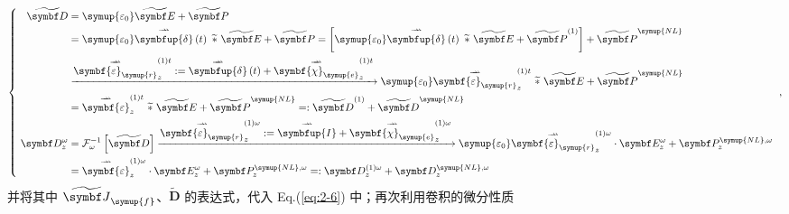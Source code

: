 \begin{equation} \label{eq:2-11}
	\left\{\ \begin{aligned} \widetilde{\symbf D} &= {\symup{\varepsilon_0}} \widetilde{\symbf E} + \widetilde{\symbf P} \\ &= {\symup{\varepsilon_0}} \overset{\rightharpoonup\!\!\!\! \rightharpoonup}{\symbfup{\delta}} \left( t \right)\ \widetilde *\ \widetilde{\symbf E} + \widetilde{\symbf P} = \left[{\symup{\varepsilon_0}} \overset{\rightharpoonup\!\!\!\! \rightharpoonup}{\symbfup{\delta}} \left( t \right)\ \widetilde *\ \widetilde{\symbf E} + \widetilde{\symbf P}^{(1)} \right] + \widetilde{\symbf P}^{{\symup{NL}}} \\& \xrightarrow[]{\displaystyle{ \overset{\rightharpoonup\!\!\!\! \rightharpoonup}{\symbf{\varepsilon}_{\symup{r}}}^{(1)t}_{z} := \overset{\rightharpoonup\!\!\!\! \rightharpoonup}{\symbfup{\delta}} \left( t \right) + \overset{\rightharpoonup\!\!\!\! \rightharpoonup}{\symbf{\chi}_{\symup{e}}}^{(1)t}_{z}}} {\symup{\varepsilon_0}} \overset{\rightharpoonup\!\!\!\! \rightharpoonup}{\symbf{\varepsilon}_{\symup{r}}}^{(1)t}_{z}\ \widetilde *\ \widetilde{\symbf E} + \widetilde{\symbf P}^{{\symup{NL}}} \\ &= \overset{\rightharpoonup\!\!\!\! \rightharpoonup}{\symbf{\varepsilon}}^{(1)t}_{z}\ \widetilde *\ \widetilde{\symbf E} + \widetilde{\symbf P}^{{\symup{NL}}} =: \widetilde{\symbf D}^{(1)} + \widetilde{\symbf D}^{{\symup{NL}}} \\ \symbf D^\omega_z &= \mathcal F^{-1}_\omega \left[ \widetilde{\symbf D} \right] \xrightarrow[]{\displaystyle{ \overset{\rightharpoonup\!\!\!\! \rightharpoonup}{\symbf{\varepsilon}_{\symup{r}}}^{(1)\omega}_{z} := \overset{\rightharpoonup\!\!\!\! \rightharpoonup}{\symbfup{I}} + \overset{\rightharpoonup\!\!\!\! \rightharpoonup}{\symbf{\chi}_{\symup{e}}}^{(1)\omega}_{z}}} {\symup{\varepsilon_0}} \overset{\rightharpoonup\!\!\!\! \rightharpoonup}{\symbf{\varepsilon}_{\symup{r}}}^{(1)\omega}_{z} \cdot \symbf E^{\omega}_z + \symbf P^{{\symup{NL}},\omega}_z \\ &= \overset{\rightharpoonup\!\!\!\! \rightharpoonup}{\symbf{\varepsilon}}^{(1)\omega}_{z} \cdot \symbf E^{\omega}_z + \symbf P^{{\symup{NL}},\omega}_z =: \symbf D^{(1)\omega}_z + \symbf D^{{\symup{NL}},\omega}_z \end{aligned}\right. ~,
\end{equation}
并将其中 $\widetilde{\symbf J}_{\symup{f}}$、$\widetilde{\symbf D}$ 的表达式，代入 Eq.(\ref{eq:2-6}) 中；再次利用卷积的微分性质
